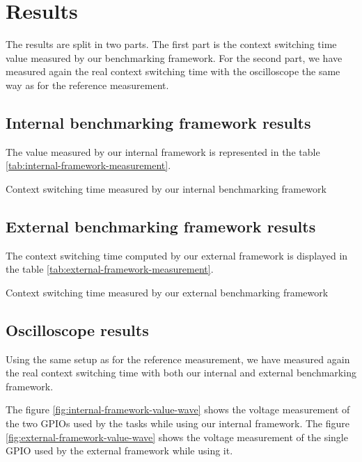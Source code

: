 \chapter{Results}

The results are split in two parts.
The first part is the context switching time value measured by our benchmarking framework.
For the second part, we have measured again the real context switching time with the oscilloscope the same way as for the reference measurement.

\section{Internal benchmarking framework results}
The value measured by our internal framework is represented in the table \ref{tab:internal-framework-measurement}.

\begin{table}[!ht]
  \centering
  
  \caption{Context switching time measured by our internal benchmarking framework}
  \label{tab:internal-framework-measurement}
  \end{table}

\section{External benchmarking framework results}
The context switching time computed by our external framework is displayed in the table \ref{tab:external-framework-measurement}.

\begin{table}[!ht]
  \centering
  
  \caption{Context switching time measured by our external benchmarking framework}
  \label{tab:external-framework-measurement}
\end{table}

\section{Oscilloscope results}
Using the same setup as for the reference measurement, we have measured again the real context switching time with both our internal and external benchmarking framework.

The figure \ref{fig:internal-framework-value-wave} shows the voltage measurement of the two GPIOs used by the tasks while using our internal framework.
The figure \ref{fig:external-framework-value-wave} shows the voltage measurement of the single GPIO used by the external framework while using it.

